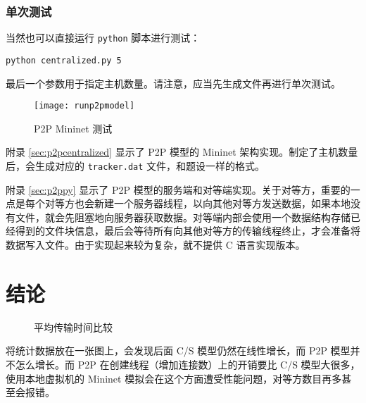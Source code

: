 
\subsubsection{单次测试}

当然也可以直接运行 \verb"python" 脚本进行测试：
\begin{lstlisting}[style=commandshell]
python centralized.py 5
\end{lstlisting}
最后一个参数用于指定主机数量。请注意，应当先生成文件再进行单次测试。

\begin{figure}[H]
    \centering
    \texttt{[image: runp2pmodel]}
    \caption{P2P Mininet 测试}\label{fig:p2pmodelrun}
\end{figure}

附录 \ref{sec:p2pcentralized} 显示了 P2P 模型的 Mininet 架构实现。制定了主机数量后，会生成对应的 \verb"tracker.dat" 文件，和题设一样的格式。

附录 \ref{sec:p2ppy} 显示了 P2P 模型的服务端和对等端实现。关于对等方，重要的一点是每个对等方也会新建一个服务器线程，以向其他对等方发送数据，如果本地没有文件，就会先阻塞地向服务器获取数据。对等端内部会使用一个数据结构存储已经得到的文件块信息，最后会等待所有向其他对等方的传输线程终止，才会准备将数据写入文件。由于实现起来较为复杂，就不提供 C 语言实现版本。

\section{结论}

\begin{figure}[H]
    \centering
    \caption{平均传输时间比较 \faPython}\label{fig:p2pmodelstat}
\end{figure}

将统计数据放在一张图上，会发现后面 C/S 模型仍然在线性增长，而 P2P 模型并不怎么增长。而 P2P 在创建线程（增加连接数）上的开销要比 C/S 模型大很多，使用本地虚拟机的 Mininet 模拟会在这个方面遭受性能问题，对等方数目再多甚至会报错。


